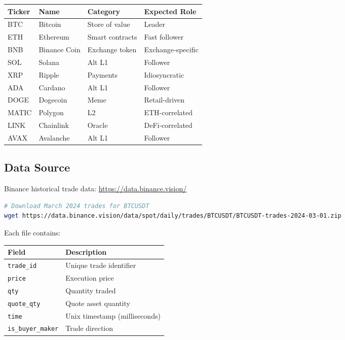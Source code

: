\documentclass[11pt, a4paper]{article}
\begin{document}
\begin{center}
\begin{tabular}{llll}
\toprule
\textbf{Ticker} & \textbf{Name} & \textbf{Category} & \textbf{Expected Role} \\
\midrule
BTC & Bitcoin & Store of value & Leader \\
ETH & Ethereum & Smart contracts & Fast follower \\
BNB & Binance Coin & Exchange token & Exchange-specific \\
SOL & Solana & Alt L1 & Follower \\
XRP & Ripple & Payments & Idiosyncratic \\
ADA & Cardano & Alt L1 & Follower \\
DOGE & Dogecoin & Meme & Retail-driven \\
MATIC & Polygon & L2 & ETH-correlated \\
LINK & Chainlink & Oracle & DeFi-correlated \\
AVAX & Avalanche & Alt L1 & Follower \\
\bottomrule
\end{tabular}
\end{center}

\subsection{Data Source}

Binance historical trade data: \url{https://data.binance.vision/}

\begin{lstlisting}[language=bash]
# Download March 2024 trades for BTCUSDT
wget https://data.binance.vision/data/spot/daily/trades/BTCUSDT/BTCUSDT-trades-2024-03-01.zip
\end{lstlisting}

Each file contains:
\begin{center}
\begin{tabular}{ll}
\toprule
\textbf{Field} & \textbf{Description} \\
\midrule
\texttt{trade\_id} & Unique trade identifier \\
\texttt{price} & Execution price \\
\texttt{qty} & Quantity traded \\
\texttt{quote\_qty} & Quote asset quantity \\
\texttt{time} & Unix timestamp (milliseconds) \\
\texttt{is\_buyer\_maker} & Trade direction \\
\bottomrule
\end{tabular}
\end{center}
\end{document}
